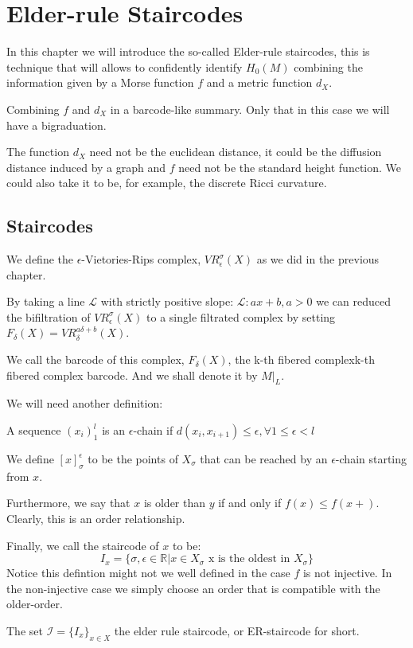\chapter{Elder-rule Staircodes}
\label{erchapter}

In this chapter we will introduce the so-called Elder-rule staircodes, this
is technique that will allows to confidently identify $H_0(M)$ combining the information given by 
a Morse function $f$ and a metric function $d_X$.

Combining $f$ and $d_X$ in a barcode-like summary. Only that in this case we will
have a bigraduation.

The function $d_X$ need not be the euclidean distance, it could be the diffusion distance
induced by a graph and $f$ need not be the standard height function. We could also take it to be,
for example, the discrete Ricci curvature.

\section{Staircodes}



We define the $\epsilon$-Vietories-Rips complex, $VR^\sigma_\epsilon(X)$ as we did in the previous chapter. 

By taking a line $\mathcal{L}$ with strictly positive slope:
$\mathcal{L}:{ax+b,a>0}$ we can reduced the bifiltration of $VR^\sigma_\epsilon(X)$ to a single filtrated complex
by setting $F_\delta(X)=VR_\delta^{a\delta+b}(X)$.

We call the barcode of this complex, $F_\delta(X)$, the k-th fibered complexk-th fibered complex barcode.
And we shall denote it by $M\vert_L$.

We will need another definition:

\begin{definition}
    A sequence $(x_i)_1^l$ is an $\epsilon$-chain if
    $d(x_i,x_{i+1})\leq \epsilon,\forall 1\leq\epsilon < l$


    We define $[x]_\sigma^\epsilon$ to be 
    the points of $X_\sigma$ that can be reached by an $\epsilon$-chain
    starting from $x$.
    
    Furthermore, we say that $x$ is older than $y$ if and only if
    $f(x)\leq f(x+)$. Clearly, this is an order relationship.

    Finally, we call the staircode of $x$ to be:
    $$
        I_x=\{
            \sigma,\epsilon\in\mathbb{R}\vert
            x\in X_\sigma 
            \text{ x is the oldest in } X_\sigma
        \}
    $$
    Notice this defintion might not we well defined in the case $f$ is not injective.
    In the non-injective case we simply choose an order that is compatible with the older-order. 

    The set $\mathcal{I}=\{I_x\}_{x\in X}$ the elder rule staircode,
    or ER-staircode for short.
\end{definition}


